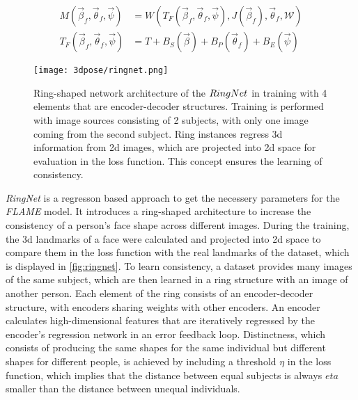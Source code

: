 \begin{equation}
\label{eq:flame}
\begin{split}
M(\vec{\beta}_{f},\vec{\theta}_{f}, \vec{\psi}) &= W(T_{F}(\vec{\beta}_{f},\vec{\theta}_{f}, \vec{\psi}),J(\vec{\beta}_{f}),\vec{\theta}_{f},\mathcal{W}) \\
T_{F}(\vec{\beta}_{f},\vec{\theta}_{f}, \vec{\psi}) &= T + B_{S}(\vec{\beta}) + B_{P}(\vec{\theta}_{f}) + B_{E} (\vec{\psi})
\end{split}
\end{equation}

\begin{figure}[h]
	\centering
	\texttt{[image: 3dpose/ringnet.png]}
	\caption{Ring-shaped network architecture of the $\protect RingNet$ in training with 4 elements that are encoder-decoder structures. Training is performed with image sources consisting of 2 subjects, with only one image coming from the second subject. Ring instances regress 3d information from 2d images, which are projected into 2d space for evaluation in the loss function. This concept ensures the learning of consistency.\cite{ringnet}}
	\label{fig:ringnet}
\end{figure}

\emph{RingNet} is a regresson based approach to get the necessery parameters for the \emph{FLAME} model. It introduces a ring-shaped architecture to increase the consistency of a person's face shape across different images. During the training, the 3d landmarks of a face were calculated and projected into 2d space to compare them in the loss function with the real landmarks of the dataset, which is displayed in \autoref{fig:ringnet}. To learn consistency, a dataset provides many images of the same subject, which are then learned in a ring structure with an image of another person. Each element of the ring consists of an encoder-decoder structure, with encoders sharing weights with other encoders. An encoder calculates high-dimensional features that are iteratively regressed by the encoder's regression network in an error feedback loop. Distinctness, which consists of producing the same shapes for the same individual but different shapes for different people, is achieved by including a threshold $\eta$ in the loss function, which implies that the distance between equal subjects is always $eta$ smaller than the distance between unequal individuals. \cite{ringnet}

